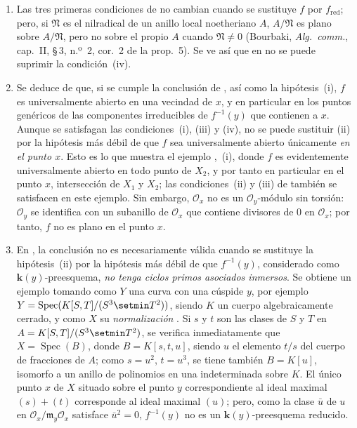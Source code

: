 \begin{remarks}[15.2.4]
\label{IV.15.2.4}
\begin{enumerate}[label=(\roman*)]
  \item Las tres primeras condiciones de  no cambian cuando se sustituye $f$ por $f_{\mathrm{red}}$; pero, si $\mathfrak N$ es el nilradical de un anillo local noetheriano $A$, $A/\mathfrak N$ es plano sobre $A/\mathfrak N$, pero no sobre el propio $A$ cuando $\mathfrak N\ne0$ (Bourbaki, \emph{Alg.\ comm.}, cap.~II, \S\,3, n.º~2, cor.~2 de la prop.~5).
Se ve así que en  no se puede suprimir la condición~(iv).
  \item Se deduce de  que, si se cumple la conclusión de , así como la hipótesis~(i), $f$ es universalmente abierto en una vecindad de $x$, y en particular en los puntos genéricos de las componentes irreducibles de $f^{-1}(y)$ que contienen a $x$.
Aunque se satisfagan las condiciones~(i), (iii) y (iv), no se puede sustituir (ii) por la hipótesis más débil de que $f$ sea universalmente abierto únicamente \emph{en el punto $x$}.
Esto es lo que muestra el ejemplo ,~(i), donde $f$ es evidentemente universalmente abierto en todo punto de $X_2$, y por tanto en particular en el punto $x$, intersección de $X_1$ y $X_2$; las condiciones~(ii) y (iii) de  también se satisfacen en este ejemplo.
Sin embargo, $\mathcal O_x$ no es un $\mathcal O_y$-módulo sin torsión: $\mathcal O_y$ se identifica con un subanillo de $\mathcal O_x$ que contiene divisores de $0$ en $\mathcal O_x$; por tanto, $f$ no es plano en el punto $x$.
  \item En , la conclusión no es necesariamente válida cuando se sustituye la hipótesis~(ii) por la hipótesis más débil de que $f^{-1}(y)$, considerado como $\boldsymbol{k}(y)$-preesquema, \emph{no tenga ciclos primos asociados inmersos}.
Se obtiene un ejemplo tomando como $Y$ una curva con una cúspide $y$, por ejemplo $Y=\operatorname{Spec}(K[S,T]/(S^3\setmin T^2))$, siendo $K$ un cuerpo algebraicamente cerrado, y como $X$ su \emph{normalización} .
Si $s$ y $t$ son las clases de $S$ y $T$ en $A=K[S,T]/(S^3\setmin T^2)$, se verifica inmediatamente que $X=\operatorname{Spec}(B)$, donde $B=K[s,t,u]$, siendo $u$ el elemento $t/s$ del cuerpo de fracciones de $A$; como $s=u^2$, $t=u^3$, se tiene también $B=K[u]$, isomorfo a un anillo de polinomios en una indeterminada sobre $K$.
El único punto $x$ de $X$ situado sobre el punto $y$ correspondiente al ideal maximal $(s)+(t)$ corresponde al ideal maximal $(u)$; pero, como la clase $\bar u$ de $u$ en $\mathcal O_x/\mathfrak m_y\mathcal O_x$ satisface $\bar u^2=0$, $f^{-1}(y)$ no es un $\boldsymbol{k}(y)$-preesquema reducido.

\end{enumerate}
\end{remarks}
